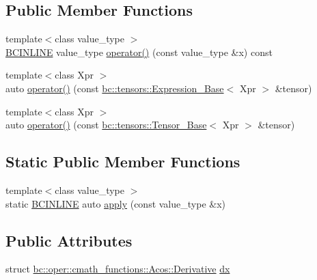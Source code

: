 \subsection*{Public Member Functions}
\begin{DoxyCompactItemize}
\item 
{\footnotesize template$<$class value\+\_\+type $>$ }\\\hyperlink{common_8h_a6699e8b0449da5c0fafb878e59c1d4b1}{B\+C\+I\+N\+L\+I\+NE} value\+\_\+type \hyperlink{structbc_1_1oper_1_1cmath__functions_1_1Acos_a32904dc6e91d12cb71f427641bc1838d}{operator()} (const value\+\_\+type \&x) const
\item 
{\footnotesize template$<$class Xpr $>$ }\\auto \hyperlink{structbc_1_1oper_1_1cmath__functions_1_1Acos_aa8deed857a666abbe71c4a06efef2469}{operator()} (const \hyperlink{classbc_1_1tensors_1_1Expression__Base}{bc\+::tensors\+::\+Expression\+\_\+\+Base}$<$ Xpr $>$ \&tensor)
\item 
{\footnotesize template$<$class Xpr $>$ }\\auto \hyperlink{structbc_1_1oper_1_1cmath__functions_1_1Acos_a2bd998572a4c0e610fe19e3da9a4941e}{operator()} (const \hyperlink{classbc_1_1tensors_1_1Tensor__Base}{bc\+::tensors\+::\+Tensor\+\_\+\+Base}$<$ Xpr $>$ \&tensor)
\end{DoxyCompactItemize}
\subsection*{Static Public Member Functions}
\begin{DoxyCompactItemize}
\item 
{\footnotesize template$<$class value\+\_\+type $>$ }\\static \hyperlink{common_8h_a6699e8b0449da5c0fafb878e59c1d4b1}{B\+C\+I\+N\+L\+I\+NE} auto \hyperlink{structbc_1_1oper_1_1cmath__functions_1_1Acos_a61ecb6ec260e18bf74d519475debc011}{apply} (const value\+\_\+type \&x)
\end{DoxyCompactItemize}
\subsection*{Public Attributes}
\begin{DoxyCompactItemize}
\item 
struct \hyperlink{structbc_1_1oper_1_1cmath__functions_1_1Acos_1_1Derivative}{bc\+::oper\+::cmath\+\_\+functions\+::\+Acos\+::\+Derivative} \hyperlink{structbc_1_1oper_1_1cmath__functions_1_1Acos_a01f276736a773a9f88e39855163c5998}{dx}
\end{DoxyCompactItemize}


